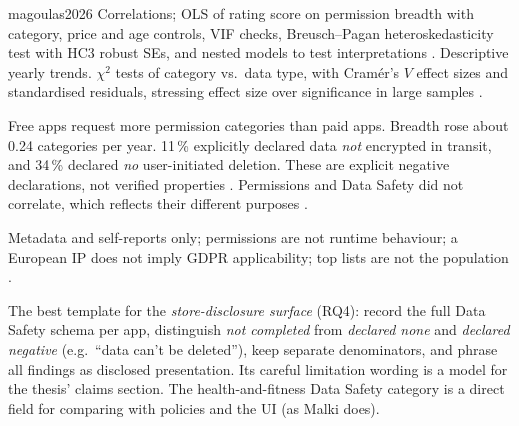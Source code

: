\begin{papercard}{magoulas2026}
 Correlations; OLS of rating score on permission breadth with category, price and age controls, VIF checks, Breusch--Pagan heteroskedasticity test with HC3 robust SEs, and nested models to test interpretations . Descriptive yearly trends. $\chi^2$ tests of category vs.\ data type, with Cramér's $V$ effect sizes and standardised residuals, stressing effect size over significance in large samples .

 Free apps request more permission categories than paid apps. Breadth rose about 0.24 categories per year. 11\,\% explicitly declared data \emph{not} encrypted in transit, and 34\,\% declared \emph{no} user-initiated deletion. These are explicit negative declarations, not verified properties . Permissions and Data Safety did not correlate, which reflects their different purposes .

 Metadata and self-reports only; permissions are not runtime behaviour; a European IP does not imply GDPR applicability; top lists are not the population .

 The best template for the \emph{store-disclosure surface} (RQ4): record the full Data Safety schema per app, distinguish \emph{not completed} from \emph{declared none} and \emph{declared negative} (e.g.\ ``data can't be deleted''), keep separate denominators, and phrase all findings as disclosed presentation. Its careful limitation wording is a model for the thesis' claims section. The health-and-fitness Data Safety category is a direct field for comparing with policies and the UI (as Malki does).
\end{papercard}
